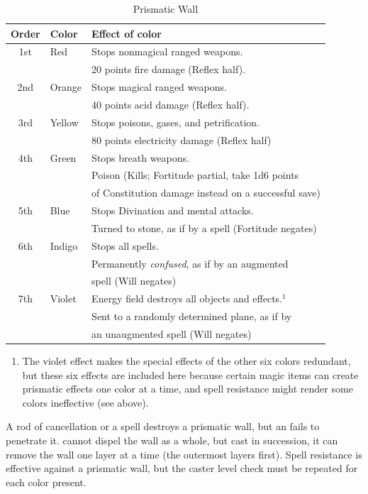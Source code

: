\begin{table}
\caption{Prismatic Wall}
\label{tab:PrismaticWall}
\begin{center}
\begin{tabular}{|c|lp{8cm}|}
\hline
Order&Color&Effect of color\\
\hline
1st	&Red	&Stops nonmagical ranged weapons.\\
	&	&20 points fire damage (Reflex half).\\
2nd	&Orange	&Stops magical ranged weapons.\\
	&	&40 points acid damage (Reflex half).\\
3rd	&Yellow	&Stops poisons, gases, and petrification.\\
	&	&80 points electricity damage (Reflex half)\\
4th	&Green	&Stops breath weapons.\\
	&	&Poison (Kills; Fortitude partial, take 1d6 points\\
	&	&of Constitution damage instead on a successful save)\\
5th	&Blue	&Stops Divination and mental attacks.\\
	&	&Turned to stone, as if by a \nameref{Spell:TransmuteFleshAndStone} spell (Fortitude negates)\\
6th	&Indigo	&Stops all spells.\\
	&	&Permanently \emph{confused}, as if by an augmented\\
	&	&\nameref{Spell:Confusion} spell (Will negates)\\
7th	&Violet	&Energy field destroys all objects and effects.$^1$\\
	&	&Sent to a randomly determined plane, as if by\\
	&	& an unaugmented \nameref{Spell:PlaneShift} spell (Will negates)\\
\hline
\end{tabular}
\end{center}
\begin{enumerate}
 \item The violet effect makes the special effects of the other six colors redundant, but these six effects are included here because certain magic items can create prismatic effects one color at a time, and spell resistance might render some colors ineffective (see above).
\end{enumerate}
\end{table}

A rod of cancellation or a  spell destroys a prismatic wall, 
but an  fails to penetrate it. 
 cannot dispel the wall as a whole, but cast in succession, it can remove the wall one layer at a time
(the outermost layers first).
Spell resistance is effective against a prismatic wall, but the caster level check must be repeated for each color present. 

